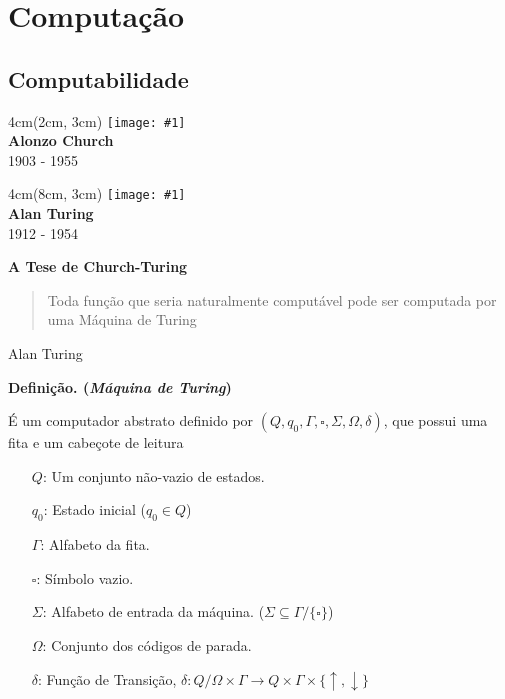 \documentclass[t]{beamer}
\newcommand{\titulo}[1]{%
	\textbf{\Large #1\\}
}
\newcommand{\definicao}[1]{%
	\textbf{Definição. (\emph{#1})\\}
}
\newcommand{\frasepor}[2]{
	\begin{center}
		\begin{quote}
			#1
		\end{quote}
		\hfill {\small #2}
	\end{center}
}
\newcommand{\person}[6]{%
\begin{textblock*}{#4}(#5, #6)
	\texttt{[image: \#1]}\\
	\textbf{#2}\\
	{\small #3}
\end{textblock*}
}
\begin{document}
	

	\section{Computação}
	
	\subsection{Computabilidade}
	
	\begin{frame}{\subsecname}
		\person{church.jpg}{Alonzo Church}{1903 - 1955}{4cm}{2cm}{3cm}
		\person{turing.jpg}{Alan Turing}{1912 - 1954}{4cm}{8cm}{3cm}
	\end{frame}
	
	\begin{frame}[label=turing]{\subsecname}
	\titulo{A Tese de Church-Turing}
	
	
	\frasepor{Toda função que seria naturalmente computável pode ser computada por uma Máquina de Turing}{Alan Turing}
	\end{frame}
	
	\begin{frame}{\subsecname}
	\definicao{Máquina de Turing}
	É um computador abstrato definido por $(Q, q_0, \Gamma, \square, \Sigma, \Omega, \delta)$, que possui uma fita e um cabeçote de leitura
	
	\begin{itemize}
		\item[$Q$:] Um conjunto não-vazio de estados.
		\item[$q_0$:] Estado inicial ($q_0 \in Q$)
		\item[$\Gamma$:] Alfabeto da fita.
		\item[$\square$:] Símbolo vazio.
		\item[$\Sigma$:] Alfabeto de entrada da máquina. ($\Sigma \subseteq \Gamma \slash \{\square\}$)
		\item[$\Omega$:] Conjunto dos códigos de parada.
		\item[$\delta$:] Função de Transição, $\delta : Q \slash \Omega \times \Gamma \to Q \times \Gamma \times \{\uparrow, \downarrow\}$
	\end{itemize}
	\end{frame}
	
\end{document}
